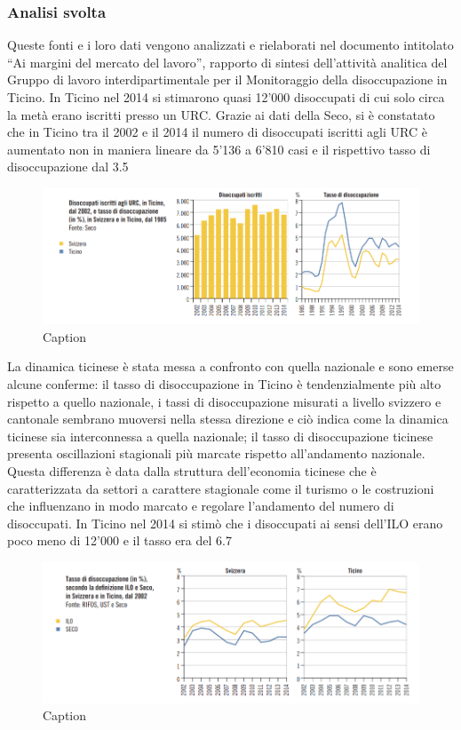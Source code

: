 \subsubsection{Analisi svolta}
Queste fonti e i loro dati vengono analizzati e rielaborati nel documento intitolato “Ai margini del mercato del lavoro”, rapporto di sintesi dell’attività analitica del Gruppo di lavoro interdipartimentale per il Monitoraggio della disoccupazione in Ticino.
In Ticino nel 2014 si stimarono quasi 12'000 disoccupati di cui solo circa la metà erano iscritti presso un URC. Grazie ai dati della Seco, si è constatato che in Ticino tra il 2002 e il 2014 il numero di disoccupati iscritti agli URC è aumentato non in maniera lineare da 5'136 a 6'810 casi e il rispettivo tasso di disoccupazione dal 3.5%
\begin{figure}
    \centering
    \includegraphics{Disoccupati iscritti agli URC.png}
    \caption{Caption}
    \label{Disoccupati iscritti agli URC, in Ticino, dal 2002 e tasso di disoccupazione}
\end{figure}
La dinamica ticinese è stata messa a confronto con quella nazionale e sono emerse alcune conferme:
il tasso di disoccupazione in Ticino è tendenzialmente più alto rispetto a quello nazionale,
i tassi di disoccupazione misurati a livello svizzero e cantonale sembrano muoversi nella stessa direzione e ciò indica come la dinamica ticinese sia interconnessa a quella nazionale;
il tasso di disoccupazione ticinese presenta oscillazioni stagionali più marcate rispetto all’andamento nazionale. Questa differenza è data dalla struttura dell’economia ticinese che è caratterizzata da settori a carattere stagionale come il turismo o le costruzioni che influenzano in modo marcato e regolare l’andamento del numero di disoccupati.
In Ticino nel 2014 si stimò che i disoccupati ai sensi dell’ILO erano poco meno di 12'000 e il tasso era del 6.7%
\begin{figure}
    \centering
    \includegraphics{Tasso di disoccupazione secondo ILO e Seco.png}
    \caption{Caption}
    \label{Tasso di disoccuapzione secondo ILO e Seco}
\end{figure}
